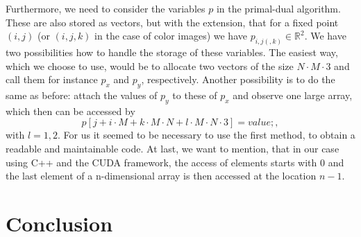 \documentclass{scrreprt}
\begin{document}
        Furthermore, we need to consider the variables $p$ in the primal-dual algorithm. These are also stored as vectors, but with the extension, that for a fixed point $(i, j)$ (or $(i, j, k)$ in the case of color images) we have $p_{i,j(,k)} \in \mathbb{R}^{2}$. We have two possibilities how to handle the storage of these variables. The easiest way, which we choose to use, would be to allocate two vectors of the size $N \cdot M \cdot 3$ and call them for instance $p_{x}$ and $p_{y}$, respectively.
        Another possibility is to do the same as before: attach the values of $p_{y}$ to these of $p_{x}$ and observe one large array, which then can be accessed by
            $$
                p[j + i \cdot M + k \cdot M \cdot N + l \cdot M \cdot N \cdot 3] = value;,
            $$
        with $l = 1, 2$. For us it seemed to be necessary to use the first method, to obtain a readable and maintainable code. At last, we want to mention, that in our case using C++ and the CUDA framework, the access of elements starts with $0$ and the last element of a n-dimensional array is then accessed at the location $n-1$.


    
    


\chapter{Conclusion} %
\label{cha:conclusion}





\end{document}
